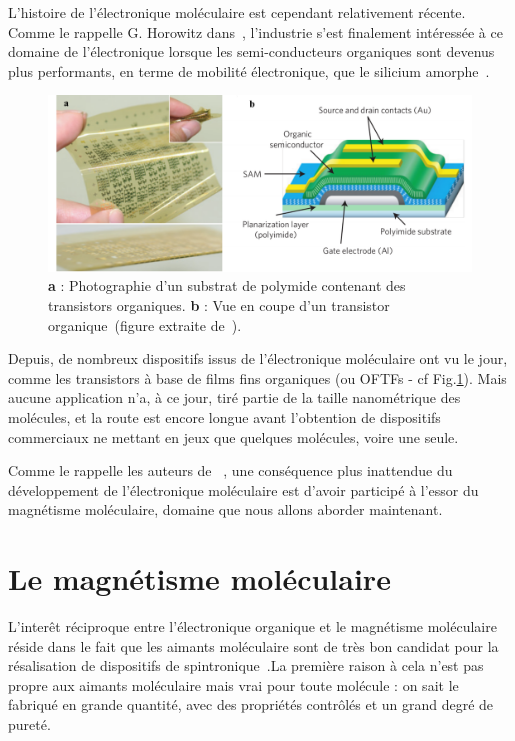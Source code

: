 L'histoire de l'électronique moléculaire est cependant relativement récente. Comme le rappelle G. Horowitz dans~\cite{Klauk2007}, l'industrie s'est finalement intéressée à ce domaine de l'électronique lorsque les semi-conducteurs organiques sont devenus plus performants, en terme de mobilité électronique, que le silicium amorphe~\cite{Lin1997}.
\begin{figure}
\centering \includegraphics[scale=0.45]{Spintronique/MolecularElec/MolecularElec.pdf}
\caption{\textbf{a} : Photographie d'un substrat de polymide contenant des transistors organiques. \textbf{b} : Vue en coupe d'un transistor organique~(figure extraite de~\cite{Sekitani2010}).}
\label{MolecularElec}
\end{figure}


Depuis, de nombreux dispositifs issus de l'électronique moléculaire ont vu le jour, comme les  transistors à base de films fins organiques (ou OFTFs - cf Fig.\ref{MolecularElec}). Mais aucune application n'a, à ce jour, tiré partie de la taille nanométrique des molécules, et la route est encore longue avant l'obtention de dispositifs commerciaux ne mettant en jeux que quelques molécules, voire une seule.

Comme le rappelle les auteurs de~\cite{Gatteschi2006} , une conséquence plus inattendue du développement de l'électronique moléculaire est d'avoir participé à l'essor du magnétisme moléculaire, domaine que nous allons aborder maintenant.


\section{Le magnétisme moléculaire}
L'interêt réciproque entre l'électronique organique et le magnétisme moléculaire réside dans le fait que les aimants moléculaire sont de très bon candidat pour la résalisation de dispositifs de spintronique~\cite{Bogani2008,Sanvito2011}.La première raison à cela n'est pas propre aux aimants moléculaire mais vrai pour toute molécule : on sait le fabriqué en grande quantité, avec des propriétés contr\^olés et un grand degré de pureté.

